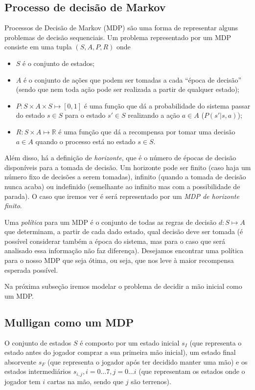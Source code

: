 \documentclass{book}
\begin{document}
\subsection{Processo de decisão de Markov}

Processos de Decisão de Markov (MDP) são uma forma de representar alguns problemas de decisão sequenciais. Um problema representado por um MDP consiste em
uma tupla $(S, A, P, R)$ onde
\begin{itemize}
  \item $S$ é o conjunto de estados;
  \item $A$ é o conjunto de ações que podem ser tomadas a cada ``época de decisão'' (sendo que nem toda ação pode ser realizada a partir de qualquer estado);
  \item $P: S \times A \times S \mapsto [0,1]$ é uma função que dá a probabilidade do sistema passar do estado $s \in S$ para o estado $s' \in S$
  realizando a ação $a \in A$ ($P(s'|s, a)$);
  \item $R: S \times A \mapsto \mathbb{R}$ é uma função que dá a recompensa por tomar uma decisão $a \in A$ quando o processo está no estado $s \in S$.
\end{itemize}

Além disso, há a definição de \textit{horizonte}, que é o número de épocas de decisão disponíveis para a tomada de decisão. Um horizonte pode ser finito (caso haja
um número fixo de decisões a serem tomadas), infinito (quando a tomada de decisão nunca acaba) ou indefinido (semelhante ao infinito mas com a possibilidade de parada).
O caso que iremos ver é será representado por um \textit{MDP de horizonte finito}.

Uma \textit{política} para um MDP é o conjunto de todas as regras de decisão $d: S \mapsto A$ que determinam, a partir de cada dado estado, qual decisão deve ser tomada
(é possível considerar também a época do sistema, mas para o caso que será analisado essa informação não faz diferença). Desejamos encontrar uma política para o
nosso MDP que seja ótima, ou seja, que nos leve à maior recompensa esperada possível.

Na próxima subseção iremos modelar o problema de decidir a mão inicial como um MDP.

\subsection{Mulligan como um MDP}


O conjunto de estados $S$ é composto por um estado inicial $s_I$ (que representa o estado antes do jogador comprar a sua primeira mão inicial),
um estado final absorvente $s_F$ (que representa o jogador após ter decidido manter uma mão) e os estados intermediários
$s_{i, j}, i=0 \ldots 7, j=0 \ldots i$ (que representam os estados onde o jogador tem $i$ cartas na mão, sendo que $j$ são terrenos).
\end{document}
